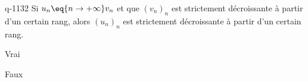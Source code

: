 \begin{truefalse}{q-1132}
Si $u_n \eq{n\to+\infty}  v_n$ et que $(v_n)_n$ est strictement décroissante à partir d'un certain rang, alors $(u_n)_n$ est strictement décroissante à partir d'un certain rang.
\item Vrai
\item* Faux
\end{truefalse}

